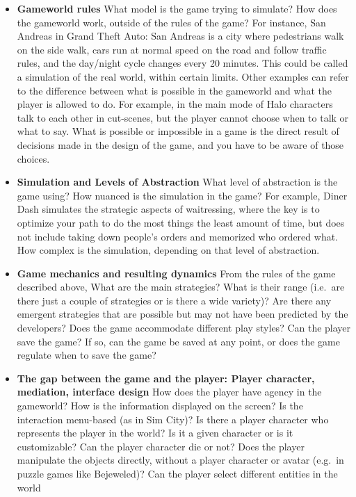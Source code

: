 \documentclass[
]{book}
\begin{document}
\begin{itemize}
\item
  \textbf{Gameworld rules}
  What model is the game trying to simulate? How does the gameworld work,
  outside of the rules of the game? For instance, San Andreas in Grand Theft Auto:
  San Andreas is a city where pedestrians walk on the side walk, cars run at
  normal speed on the road and follow traffic rules, and the day/night cycle
  changes every 20 minutes. This could be called a simulation of the real world,
  within certain limits. Other examples can refer to the difference between what is
  possible in the gameworld and what the player is allowed to do. For example, in
  the main mode of Halo characters talk to each other in cut-scenes, but the player
  cannot choose when to talk or what to say. What is possible or impossible in a
  game is the direct result of decisions made in the design of the game, and you
  have to be aware of those choices.
\item
  \textbf{Simulation and Levels of Abstraction}
  What level of abstraction is the game using? How nuanced is the simulation in
  the game? For example, Diner Dash simulates the strategic aspects of
  waitressing, where the key is to optimize your path to do the most things the least
  amount of time, but does not include taking down people's orders and
  memorized who ordered what. How complex is the simulation, depending on that
  level of abstraction.
\item
  \textbf{Game mechanics and resulting dynamics}
  From the rules of the game described above, What are the main strategies? What
  is their range (i.e.~are there just a couple of strategies or is there a wide variety)?
  Are there any emergent strategies that are possible but may not have been
  predicted by the developers? Does the game accommodate different play styles?
  Can the player save the game? If so, can the game be saved at any point, or does
  the game regulate when to save the game?
\item
  \textbf{The gap between the game and the player: Player character, mediation, interface design}
  How does the player have agency in the gameworld? How is the information
  displayed on the screen? Is the interaction menu-based (as in Sim City)? Is there
  a player character who represents the player in the world? Is it a given character
  or is it customizable? Can the player character die or not? Does the player
  manipulate the objects directly, without a player character or avatar (e.g.~in
  puzzle games like Bejeweled)? Can the player select different entities in the world

\end{itemize}
\end{document}
